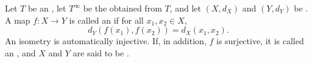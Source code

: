 \begin{definition} \label{definition:isometry_between_extended_metric_spaces}
Let $T$ be an , let $T^\infty$ be the  obtained from $T$, and let $(X, d_X)$ and $(Y, d_Y)$ be . A map $f : X \to Y$ is called an  if for all $x_1, x_2 \in X$,
\[
d_Y( f(x_1), f(x_2) ) = d_X( x_1, x_2 ).
\]
An isometry is automatically injective. If, in addition, $f$ is surjective, it is called an , and $X$ and $Y$ are said to be .
\end{definition}